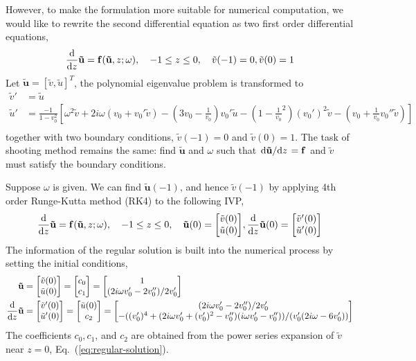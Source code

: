 However, to make the formulation more suitable for numerical computation, we would like to rewrite the second differential equation as two first order differential equations,
\begin{equation}
	\dv{z}\mathbf{\tilde{u}} = \mathbf{f}(\mathbf{\tilde{u}},z;\omega),
	\quad
	-1 \leq z \leq 0,
	\quad
	\tilde{v}(-1) = 0, \tilde{v}(0) = 1
	\label{eq:shooting-method-formulation}
\end{equation}
Let $\mathbf{\tilde{u}} = [\tilde{v}, \tilde{u}]^T$, the polynomial eigenvalue problem is transformed to
\begin{align*}
	\tilde{v}' & = \tilde{u}                \\
	\tilde{u}' & = \frac{-1}{1-v_0^2}\left[
		\omega^2\tilde{v} + 2i\omega(v_0+v_0'\tilde{v}) - \left(3v_0 - \frac{1}{v_0}\right)v_0'\tilde{u} - \left(1-\frac{1}{v_0}^2\right)(v_0')^2\tilde{v} - \left(v_0+\frac{1}{v_0}v_0''\tilde{v}\right)
	\right]                                 \\
\end{align*}
together with two boundary conditions, $\tilde{v}(-1) = 0$ and $\tilde{v}(0) = 1$. The task of shooting method remains the same: find $\mathbf{\tilde{u}}$ and $\omega$ such that $\dv*{\mathbf{\tilde{u}}}{z} = \mathbf{f}$ and $\tilde{v}$ must satisfy the boundary conditions.

Suppose $\omega$ is given. We can find $\mathbf{\tilde{u}}(-1)$, and hence $\tilde{v}(-1)$ by applying 4th order Runge-Kutta method (RK4) to the following IVP,
\begin{equation}
	\dv{z}\mathbf{\tilde{u}} = \mathbf{f}(\mathbf{\tilde{u}},z;\omega), \quad
	-1 \leq z \leq 0, \quad
	\mathbf{\tilde{u}}(0)=\mqty[\tilde{v}(0) \\ \tilde{u}(0)], \dv{z}\mathbf{\tilde{u}}(0) =\mqty[\tilde{v}'(0) \\ \tilde{u}'(0)]
	\label{eq:shooting-method-ivp}
\end{equation}
The information of the regular solution is built into the numerical process by setting the initial conditions,
\begin{equation}
	\begin{aligned}
		\mathbf{\tilde{u}}       & = \mqty[\tilde{v}(0)  \\ \tilde{u}(0)]
		= \mqty[c_0                                      \\ c_1]
		= \mqty[1                                        \\ (2i\omega v_0'-2v_0'')/2v_0'] \\
		\dv{z}\mathbf{\tilde{u}} & = \mqty[\tilde{v}'(0) \\ \tilde{u}'(0)]
		= \mqty[\tilde{u}(0)                             \\ c_2]
		= \mqty[(2i\omega v_0'-2v_0'')/2v_0'             \\ -((v_0')^4+(2i\omega v_0' + (v_0')^2 - v_0'')(i\omega v_0' - v_0''))/(v_0'(2i\omega-6v_0'))]
	\end{aligned}
\end{equation}
The coefficients $c_0, c_1$, and $c_2$ are obtained from the power series expansion of $\tilde{v}$ near $z=0$, Eq.~(\ref{eq:regular-solution}).

